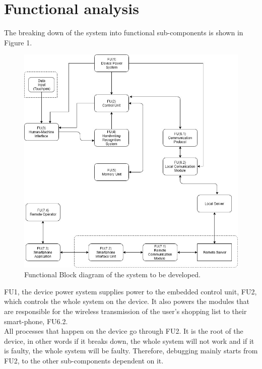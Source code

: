 {\newpage






\section{Functional analysis}
The breaking down of the system into functional sub-components is shown in Figure 1.
\begin{figure}[h]
	\centering
	\includegraphics[scale=0.63]{blockchan.jpg}
	\caption{Functional Block diagram of the system to be developed.}
\end{figure}
\clearpage
\noindent
FU1, the device power system supplies power to the embedded control unit, FU2, which controls the whole system on the device. It also powers the modules that are responsible for the wireless transmission of the user's shopping list to their smart-phone, FU6.2. \\
All processes that happen on the device go through FU2. It is the root of the device, in other words if it breaks down, the whole system will not work and if it is faulty, the whole system will be faulty. Therefore, debugging mainly starts from FU2, to the other sub-components dependent on it.\\
}
